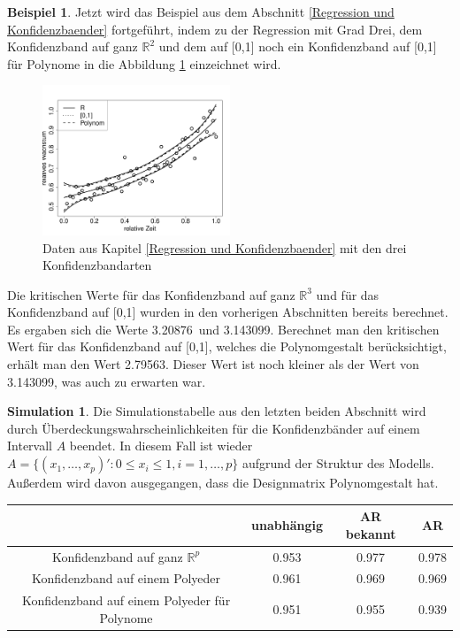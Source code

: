 \documentclass[12pt,a4paper]{article}
\theoremstyle{definition}
\newtheorem{Beispiel}[Definition]{Beispiel}
\theoremstyle{definition}
\theoremstyle{definition}
\newtheorem{Simulation}[Definition]{Simulation}
\theoremstyle{definition}
\newcommand{\cR}{3.20876}
\newcommand{\cA}{3.143099}
\newcommand{\cAP}{2.79563}
\newcommand{\UeberRR}{0.953}
\newcommand{\UeberRMinmax}{0.961}
\newcommand{\UeberRMinmaxPolyfast}{0.951}
\newcommand{\UeberARbekanntR}{0.977}
\newcommand{\UeberARbekanntMinmax}{0.969}
\newcommand{\UeberARbekanntMinmaxPolyfast}{0.955}
\newcommand{\UeberARR}{0.978}
\newcommand{\UeberARMinmax}{0.969}
\newcommand{\UeberARMinmaxPolyfast}{0.939}
\begin{document}
\begin{Beispiel}
Jetzt wird das Beispiel aus dem Abschnitt \ref{Regression und Konfidenzbaender} fortgeführt, indem zu der Regression mit Grad Drei, dem Konfidenzband auf ganz $\mathbb{R}^2$ und dem auf [0,1] noch ein Konfidenzband auf [0,1] für Polynome in die Abbildung \ref{KB-poly-BSP} einzeichnet wird.

\begin{figure}[H] 
  \centering
     \includegraphics[width=0.5\textwidth]{Bsp-KB-poly}
  \caption{Daten aus Kapitel \ref{Regression und Konfidenzbaender} mit den drei Konfidenzbandarten}
  \label{KB-poly-BSP}
\end{figure}

Die kritischen Werte für das Konfidenzband auf ganz $\mathbb{R}^{3}$ und für das Konfidenzband auf [0,1] wurden in den vorherigen Abschnitten bereits berechnet. Es ergaben sich die Werte \cR ~und \cA . Berechnet man den kritischen Wert für das Konfidenzband auf [0,1], welches die Polynomgestalt berücksichtigt, erhält man den Wert \cAP . Dieser Wert ist noch kleiner als der Wert von \cA , was auch zu erwarten war.
\end{Beispiel}

\begin{Simulation}
Die Simulationstabelle aus den letzten beiden Abschnitt wird durch Überdeckungswahrscheinlichkeiten für die Konfidenzbänder auf einem Intervall $A$ beendet. In diesem Fall ist wieder $A = \{ (x_1, \ldots, x_p)' : 0 \leq x_i \leq 1, i=1, \ldots, p \}$ aufgrund der Struktur des Modells. Außerdem wird davon ausgegangen, dass die Designmatrix Polynomgestalt hat.

\begin{center}
\begin{tabular}{|c|c|c|c|}
\hline 
& unabhängig & AR bekannt & AR \\ 
\hline 
Konfidenzband auf ganz $\mathbb{R}^{p}$		 & \UeberRR		  & \UeberARbekanntR & \UeberARR \\ 
\hline 
Konfidenzband auf einem Polyeder	 & \UeberRMinmax  & \UeberARbekanntMinmax & \UeberARMinmax \\ 
\hline 
Konfidenzband auf einem Polyeder für Polynome  & \UeberRMinmaxPolyfast & \UeberARbekanntMinmaxPolyfast & \UeberARMinmaxPolyfast \\ 
\hline 
\end{tabular} 
\end{center}

\end{Simulation}
\end{document}
